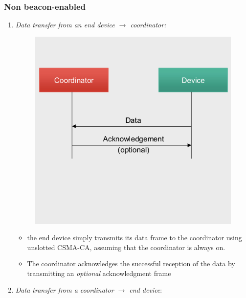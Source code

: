 \subsubsection{Non beacon-enabled}
\begin{enumerate}
   \item \textit{Data transfer from an end device $\longrightarrow$ coordinator:}
   \begin{paracol}{2}
      \colfill
      
      \begin{figure}[htbp]
         \centering
         \includegraphics[width=0.6\columnwidth]{images/802_datatransfer_3.png}
         \label{fig:802_datatransfer_3}
      \end{figure}
      \colfill
      \switchcolumn
      \colfill
      \begin{itemize}
         \item the end device simply transmits its data frame to the coordinator using unslotted CSMA-CA, assuming that the coordinator is always on.
         \item The coordinator acknowledges the successful reception of the data by transmitting an \textit{optional} acknowledgment frame
      \end{itemize}
      \colfill
   \end{paracol}
   \item \textit{Data transfer from a coordinator $\longrightarrow$ end device}:
   \begin{paracol}{2}
      \colfill
      

\end{paracol}
\end{enumerate}
